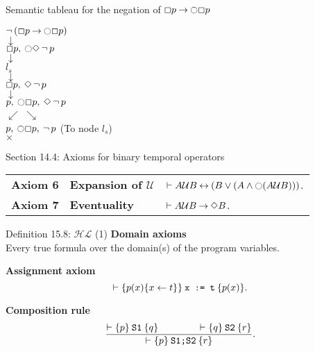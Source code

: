 \documentclass[style=simple,size=12pt]{powerdot}
\begin{document}
\begin{wideslide}[bm=,toc=]{Semantic tableau for the negation of $\Box p\mathbin{\rightarrow} \mathord{\ocircle} \Box p$}
\begin{center}
$\mathop{\neg}\,(\Box p\mathbin{\rightarrow} \mathord{\ocircle} \Box p)$ \\
$\downarrow$ \\
$\Box p,\: \mathord{\ocircle} \Diamond \mathop{\neg} p$ \\
$\downarrow$ \\
\smallskip
$l_{s}\;$  \\
\smallskip
$\downarrow$ \\
$\Box p,\: \Diamond \mathop{\neg} p$ \\
$\downarrow$ \\
$p,\: \mathord{\ocircle} \Box p,\: \Diamond \mathop{\neg} p$ \\
$\swarrow$ \hspace{4em} $\searrow$ \\
$p,\:   \mathord{\ocircle} \Box p,\: \mathop{\neg} p$ \hspace{2.5em}
(To node $l_{s}$)\\
$\times$ \hspace*{7em} %
\end{center}
\end{wideslide}

\begin{wideslide}[bm=,toc=]{Section 14.4: Axioms for binary temporal
operators}
\vspace*{2ex}
\begin{center}
\begin{tabular}{lll}
\textbf{Axiom 6} & \textbf{Expansion of $\mathcal{U}$} &  $\vdash A \mathcal{U} B \mathbin{\leftrightarrow} (B \vee (A \wedge  \mathord{\ocircle} (A \mathcal{U} B)))$.\\
\textbf{Axiom 7} & \textbf{Eventuality} & $\vdash A \mathcal{U} B \mathbin{\rightarrow} \Diamond B$.
\end{tabular}
\end{center}
\end{wideslide}




\begin{wideslide}[bm=,toc=]{Definition 15.8: $\mathcal{HL}$ (1)}
\noindent\textbf{Domain axioms}\\
\hspace*{1cm}Every true formula over the domain(s)
of the program variables.

\bigskip

\noindent\textbf{Assignment axiom}
\[\vdash\induct{p(x)\{x\leftarrow t\}}{x\ :=\ t}{p(x)}.\]

\noindent\textbf{Composition rule}
\[\frac{\vdash\{p\}\:{\textup{\texttt{S1}}}\:\{q\}\hspace{4em}\vdash\{q\}\:{\textup{\texttt{S2}}}\:\{r\}}
{\vdash\{p\}\:{\textup{\texttt{S1;S2}}}\:\{r\}}.\]
\end{wideslide}
\end{document}
